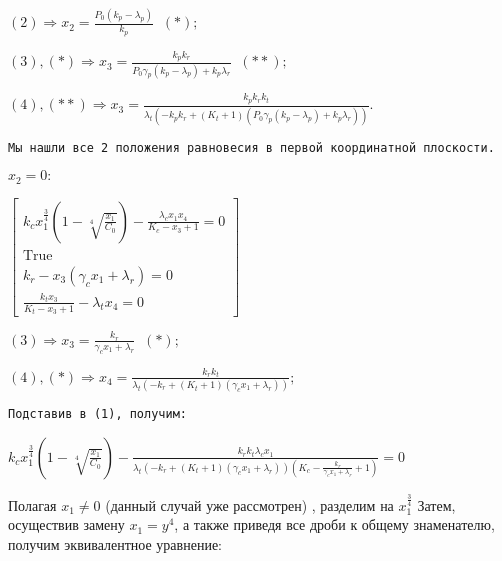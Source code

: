 \documentclass[11pt]{article}
\begin{document}
    $(2) \Rightarrow x_2 = \frac{P_{0} \left(k_{p} - \lambda_{p}\right)}{k_{p}} \;\; (*);$

    
    $(3),(*) \Rightarrow x_3 = \frac{k_{p} k_{r}}{P_{0} \gamma_{p} \left(k_{p} - \lambda_{p}\right) + k_{p} \lambda_{r}} \;\; (**);$

    
    $(4),(**) \Rightarrow x_3 = \frac{k_{p} k_{r} k_{t}}{\lambda_{t} \left(- k_{p} k_{r} + \left(K_{t} + 1\right) \left(P_{0} \gamma_{p} \left(k_{p} - \lambda_{p}\right) + k_{p} \lambda_{r}\right)\right)}.$

    
    \begin{Verbatim}[commandchars=\\\{\}]
Мы нашли все 2 положения равновесия в первой координатной плоскости.
    \end{Verbatim}

    $x_2 = 0:$

    
    $\displaystyle \left[\begin{matrix}k_{c} x_{1}^{\frac{3}{4}} \left(1 - \sqrt[4]{\frac{x_{1}}{C_{0}}}\right) - \frac{\lambda_{c} x_{1} x_{4}}{K_{c} - x_{3} + 1} = 0\\\text{True}\\k_{r} - x_{3} \left(\gamma_{c} x_{1} + \lambda_{r}\right) = 0\\\frac{k_{t} x_{3}}{K_{t} - x_{3} + 1} - \lambda_{t} x_{4} = 0\end{matrix}\right]$

    
    $(3) \Rightarrow x_3 = \frac{k_{r}}{\gamma_{c} x_{1} + \lambda_{r}} \;\; (*);$

    
    $(4),(*) \Rightarrow x_4 = \frac{k_{r} k_{t}}{\lambda_{t} \left(- k_{r} + \left(K_{t} + 1\right) \left(\gamma_{c} x_{1} + \lambda_{r}\right)\right)};$

    
    \begin{Verbatim}[commandchars=\\\{\}]
Подставив в (1), получим:
    \end{Verbatim}

    $\displaystyle k_{c} x_{1}^{\frac{3}{4}} \left(1 - \sqrt[4]{\frac{x_{1}}{C_{0}}}\right) - \frac{k_{r} k_{t} \lambda_{c} x_{1}}{\lambda_{t} \left(- k_{r} + \left(K_{t} + 1\right) \left(\gamma_{c} x_{1} + \lambda_{r}\right)\right) \left(K_{c} - \frac{k_{r}}{\gamma_{c} x_{1} + \lambda_{r}} + 1\right)} = 0$

    
    Полагая \(x_1 \neq 0\) (данный случай уже рассмотрен) , разделим на
\(x_1^{\frac{3}{4}}\) Затем, осуществив замену \(x_1 = y^4\), а также
приведя все дроби к общему знаменателю, получим эквивалентное уравнение:
\end{document}
